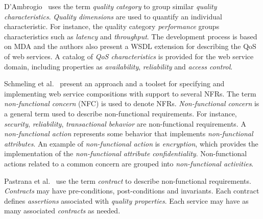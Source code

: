 \documentclass{sig-alternate}
\begin{document}
D'Ambrogio~\cite{DAmbrogio06} uses the term \textit{quality category} to group similar \textit{quality characteristics}. 
\textit{Quality dimensions} are used to quantify an individual characteristic.
For instance, the quality category \textit{performance} groups characteristics such as
\textit{latency} and \textit{throughput}. 
The development process is based on MDA and the authors also present a WSDL extension for describing the QoS of web services. A catalog of \textit{QoS characteristics} is provided for the web service domain, including properties as \textit{availability}, \textit{reliability} and \textit{access control}. 

 
Schmeling et al.~\cite{SchmelingCM11} present an approach and a toolset for specifying and implementing web service compositions with support to several NFRs. The term \textit{non-functional concern} (NFC) is used to denote  NFRs. 
\textit{Non-functional concern} is a general term used to describe non-functional requirements. 
For instance, \textit{security}, \textit{reliability}, \textit{transactional behavior} are non-functional requirements. 
A \textit{non-functional action} represents some behavior that implements \textit{non-functional attributes}. 
An example of \textit{non-functional action} is \textit{encryption}, which provides the implementation of the \textit{non-functional attribute} \textit{confidentiality}. 
Non-functional actions related to a common concern are grouped into \textit{non-functional activities}. 

Pastrana et al.~\cite{PastranaPK11} use the term \textit{contract} to describe non-functional requirements. 
\textit{Contracts} may have pre-conditions, post-conditions and invariants. 
Each contract defines \textit{assertions} associated with \textit{quality properties}. 
Each service may have as many associated \textit{contracts} as needed.

 
\end{document}
